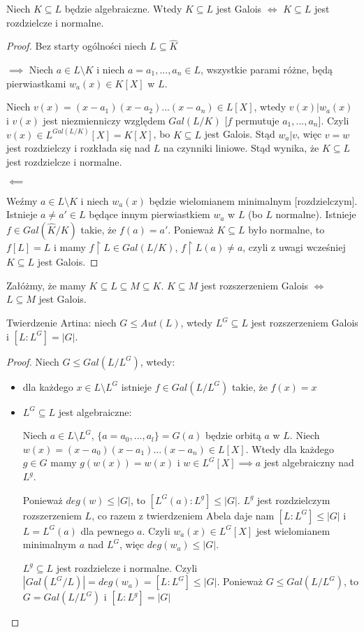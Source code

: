 \begin{theorem}
Niech $K\subseteq L$ będzie algebraiczne. Wtedy $K\subseteq L$ jest Galois $\iff$ $K\subseteq L$ jest rozdzielcze i normalne.
\end{theorem}
\begin{proof}
Bez starty ogólności niech $L\subseteq\hat{K}$

$\implies$ Niech $a\in L\setminus K$ i niech $a=a_1,...,a_n\in L$, wszystkie parami różne, będą pierwiastkami $w_a(x)\in K[X]$ w $L$.

Niech $v(x)=(x-a_1)(x-a_2)...(x-a_n)\in L[X]$, wtedy $v(x)|w_a(x)$ i $v(x)$ jest niezmienniczy względem $Gal(L/K)$ [$f$ permutuje $a_1,...,a_n$]. Czyli $v(x)\in L^{Gal(L/K)}[X]=K[X]$, bo $K\subseteq L$ jest Galois. Stąd $w_a|v$, więc $v=w$ jest rozdzielczy i rozkłada się nad $L$ na czynniki liniowe. Stąd wynika, że $K\subseteq L$ jest rozdzielcze i normalne.

$\impliedby$

Weźmy $a\in L\setminus K$ i niech $w_a(x)$ będzie wielomianem minimalnym [rozdzielczym]. Istnieje $a\neq a'\in L$ będące innym pierwiastkiem $w_a$ w $L$ (bo $L$ normalne). Istnieje $f\in Gal(\hat{K}/K)$ takie, że $f(a)=a'$. Ponieważ $K\subseteq L$ było normalne, to $f[L]=L$ i mamy $f\restriction L\in Gal(L/K)$, $f\restriction L(a)\neq a$, czyli z uwagi wcześniej $K\subseteq L$ jest Galois.
\end{proof}

\begin{conclusion}
Załóżmy, że mamy $K\subseteq L\subseteq M\subseteq K$. $K\subseteq M$ jest rozszerzeniem Galois $\iff$ $L\subseteq M$ jest Galois.
\end{conclusion}

\begin{theorem}[Artin]\label{twierdzenie Artina}
Twierdzenie Artina: niech $G\leq Aut(L)$, wtedy $L^G\subseteq L$ jest rozszerzeniem Galois i $[L:L^G]=|G|$.
\end{theorem}
\begin{proof}
Niech $G\leq Gal(L/L^G)$, wtedy:
\begin{itemize}
    \item dla każdego $x\in L\setminus L^G$ istnieje $f\in Gal(L/L^G)$ takie, że $f(x)=x$
    \item $L^G\subseteq L$ jest algebraiczne:

    Niech $a\in L\setminus L^G$, $\{a=a_0,...,a_l\}=G(a)$ będzie orbitą $a$ w $L$. Niech $w(x)=(x-a_0)(x-a_1)...(x-a_n)\in L[X]$. Wtedy dla każdego $g\in G$ mamy $g(w(x))=w(x)$ i $w\in L^G[X]\implies a$ jest algebraiczny nad $L^g$.

    Ponieważ $deg(w)\leq |G|$, to $[L^G(a):L^g]\leq |G|$. $L^g$ jest rozdzielczym rozszerzeniem $L$, co razem z twierdzeniem Abela daje nam $[L:L^G]\leq |G|$ i $L=L^G(a)$ dla pewnego $a$. Czyli $w_a(x)\in L^G[X]$ jest wielomianem minimalnym $a$ nad $L^G$, więc $deg(w_a)\leq|G|$. 

    $L^g\subseteq L$ jest rozdzielcze i normalne. Czyli $|Gal(L^G/L)|=deg(w_a)=[L:L^G]\leq|G|$. Ponieważ $G\leq Gal(L/L^G)$, to $G=Gal(L/L^G)$ i $[L:L^g]=|G|$
\end{itemize}
\end{proof}

